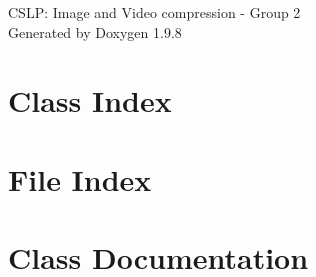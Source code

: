 \documentclass[twoside]{book}
\newcommand{\+}{\discretionary{\mbox{\scriptsize$\hookleftarrow$}}{}{}}
\newcommand{\clearemptydoublepage}{%
    \newpage{\pagestyle{empty}\cleardoublepage}%
  }
\begin{document}
  \raggedbottom
    \hypersetup{pageanchor=false,
                bookmarksnumbered=true,
                pdfencoding=unicode
               }
  \begin{titlepage}
  \vspace*{7cm}
  \begin{center}%
  {\Large CSLP\+: Image and Video compression -\/ Group 2}\\
  \vspace*{1cm}
  {\large Generated by Doxygen 1.9.8}\\
  \end{center}
  \end{titlepage}
  \clearemptydoublepage
  \tableofcontents
  \clearemptydoublepage
  \hypersetup{pageanchor=true}


\chapter{Class Index}

\chapter{File Index}

\chapter{Class Documentation}





\end{document}
